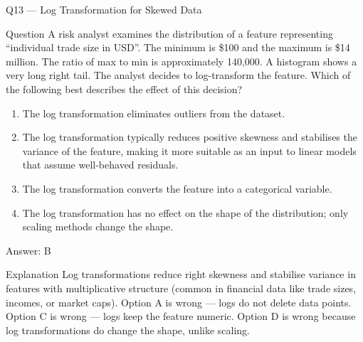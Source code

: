 \documentclass[aspectratio=169,8pt]{beamer}
\begin{document}
	
	\begin{frame}{Q13 --- Log Transformation for Skewed Data}
		\begin{block}{Question}
			A risk analyst examines the distribution of a feature representing ``individual trade size in USD''. The minimum is \$100 and the maximum is \$14 million. The ratio of max to min is approximately 140,000. A histogram shows a very long right tail. The analyst decides to log-transform the feature. Which of the following best describes the effect of this decision?
		\end{block}
		\begin{enumerate}
			\item The log transformation eliminates outliers from the dataset.
			\item The log transformation typically reduces positive skewness and stabilises the variance of the feature, making it more suitable as an input to linear models that assume well-behaved residuals.
			\item The log transformation converts the feature into a categorical variable.
			\item The log transformation has no effect on the shape of the distribution; only scaling methods change the shape.
		\end{enumerate}
		\begin{exampleblock}{Answer: B}\end{exampleblock}
		\begin{block}{Explanation}
			Log transformations reduce right skewness and stabilise variance in features with multiplicative structure (common in financial data like trade sizes, incomes, or market caps). Option A is wrong --- logs do not delete data points. Option C is wrong --- logs keep the feature numeric. Option D is wrong because log transformations do change the shape, unlike scaling.
		\end{block}
	\end{frame}
	
\end{document}
